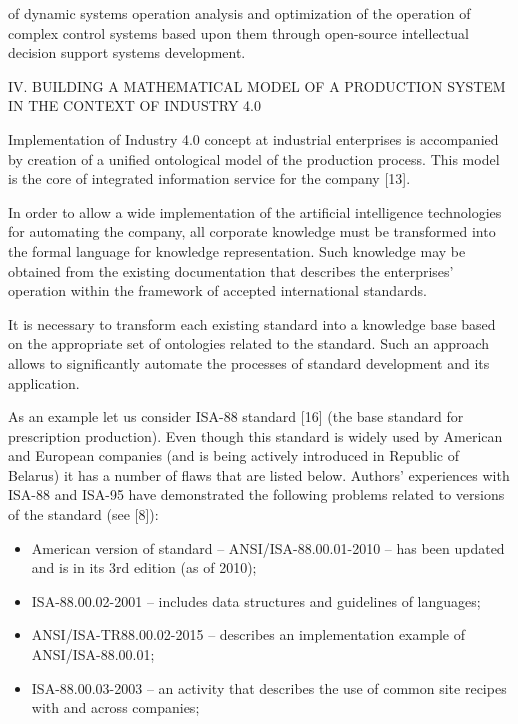 \documentclass{article}
\begin{document}
\begin{multicols}{2}
\noindent of dynamic systems operation analysis and optimization
of the operation of complex control systems based upon
them through open-source intellectual decision support
systems development.
\begin{center}
\small IV. BUILDING A MATHEMATICAL MODEL OF A PRODUCTION SYSTEM IN THE CONTEXT OF INDUSTRY 4.0
\end{center}
\par
Implementation of Industry 4.0 concept at industrial
enterprises is accompanied by creation of a unified
ontological model of the production process. This model is
the core of integrated information service for the company
[13]. \par
In order to allow a wide implementation of the artificial
intelligence technologies for automating the company, all
corporate knowledge must be transformed into the formal
language for knowledge representation. Such knowledge
may be obtained from the existing documentation that
describes the enterprises’ operation within the framework
of accepted international standards. \par
It is necessary to transform each existing standard
into a knowledge base based on the appropriate set of
ontologies related to the standard. Such an approach
allows to significantly automate the processes of standard
development and its application. \par
As an example let us consider ISA-88 standard [16]
(the base standard for prescription production). Even
though this standard is widely used by American and
European companies (and is being actively introduced
in Republic of Belarus) it has a number of flaws that
are listed below. Authors’ experiences with ISA-88 and
ISA-95 have demonstrated the following problems related
to versions of the standard (see [8]):
\begin{itemize}
    \renewcommand{\labelitemi}{1)}
    \item American version of standard – ANSI/ISA-88.00.01-2010 – has been updated and is in its 3rd edition (as of 2010);
    \renewcommand{\labelitemi}{2)}
    \item ISA-88.00.02-2001 – includes data structures and guidelines of languages;
    \renewcommand{\labelitemi}{3)}
    \item ANSI/ISA-TR88.00.02-2015 – describes an implementation example of ANSI/ISA-88.00.01;
    \renewcommand{\labelitemi}{4)}
    \item ISA-88.00.03-2003 – an activity that describes the use of common site recipes with and across companies;

\end{itemize}
\end{multicols}
\end{document}
